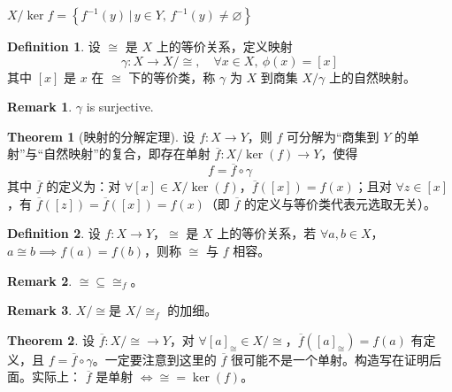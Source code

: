 \documentclass[oneside]{book}
\theoremstyle{definition}
\newtheorem{definition}{Definition}[section]
\newtheorem{theorem}{Theorem}[section]
\newtheorem{remark}{Remark}[section]
\begin{document}
\(X/\ker f=\left\{ f^{-1}(y) \,\big|\, y \in Y, \, f^{-1}(y) \neq \varnothing \right\}\)


\begin{definition}
	设 \( \cong \) 是 \( X \) 上的等价关系，定义映射
	\[
	\gamma: X \to X/{\cong}, \quad \forall x \in X, \ \phi(x) = [x]
	\]
	其中 \( [x] \) 是 \( x \) 在 \( \cong \) 下的等价类，称 \( \gamma \) 为 \( X \) 到商集 \( X/{\gamma} \) 上的自然映射。
\end{definition}

\begin{remark}
	 \( \gamma \)  is surjective.
\end{remark}

\begin{theorem}[映射的分解定理]
	设 \( f: X \to Y \)，则 \( f \) 可分解为“商集到 \( Y \) 的单射”与“自然映射”的复合，即存在单射 \( \overline{f}: X/\ker(f) \to Y \)，使得
	\[
	f = \overline{f} \circ \gamma
	\]
	其中 \( \overline{f} \) 的定义为：对 \( \forall [x] \in X/\ker(f) \)，\( \overline{f}([x]) = f(x) \)；且对 \( \forall z \in [x] \)，有 \( \overline{f}([z]) = \overline{f}([x]) = f(x) \)（即 \( \overline{f} \) 的定义与等价类代表元选取无关）。
\end{theorem}

	\begin{definition}
	设 \( f: X \to Y \)，\( \cong \) 是 \( X \) 上的等价关系，若 \( \forall a,b \in X \)，\( a \cong b \implies f(a) = f(b) \)，则称 \( \cong \) 与 \( f \) 相容。
\end{definition}
\begin{remark}
	 \( \cong \subseteq \cong_f \)。
\end{remark}
\begin{remark}
	\( X/\cong \)是 \( X/\cong_f \) 的加细。
\end{remark}
\begin{theorem}
	设 \( \overline{f}: X/{\cong} \to Y \)，对 \( \forall [a]_{\cong} \in X/{\cong} \)，\( \overline{f}([a]_{\cong}) = f(a) \) 有定义，且 \( f = \overline{f} \circ \gamma \)。一定要注意到这里的 \(\overline{f}\) 很可能不是一个单射。构造写在证明后面。实际上： \( \overline{f} \) 是单射 \( \iff \cong = \ker(f) \)。
\end{theorem}
\end{document}
